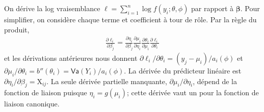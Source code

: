 \documentclass[
  11pt,
  letterpaper,
]{article}
\theoremstyle{definition}
\theoremstyle{definition}
\theoremstyle{definition}
\theoremstyle{definition}
\theoremstyle{remark}
\begin{document}
On dérive la log vraisemblance \(\ell = \sum_{i=1}^n \log f(y_i; \theta, \phi)\) par rapport à
\(\boldsymbol{\beta}\). Pour simplifier, on considère chaque terme et coefficient à tour de rôle. Par la règle du produit,
\begin{align*}
\frac{\partial \ell_i}{\partial \beta_j} = \frac{\partial
\eta_i}{\partial \beta_j} \frac{\partial \mu_i}{\partial \eta_i}
\frac{\partial \theta_i}{\partial \mu_i}\frac{\partial
\ell_i}{\partial \theta_i}
\end{align*}
et les dérivations antérieures nous donnent \(\partial \ell_i/\partial \theta_i = (y_j-\mu_i)/a_i(\phi)\) et \(\partial \mu_i / \partial \theta_i = b''(\theta_i) = \mathsf{Va}(Y_i)/a_i(\phi)\).
La dérivée du prédicteur linéaire est \(\partial \eta_i / \partial \beta_j = \mathrm{X}_{ij}\). La seule dérivée partielle manquante, \(\partial \mu_i/\partial \eta_i\), dépend de la fonction de liaison puisque \(\eta_i = g(\mu_i)\); cette dérivée vaut un pour la fonction de liaison canonique.
\end{document}
